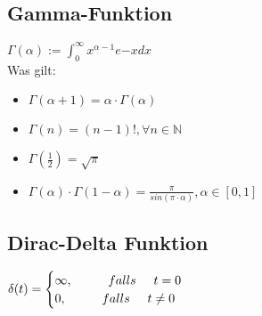 \begin{minipage}[t]{0.48\linewidth}
	
\subsection{Gamma-Funktion}
$\Gamma (\alpha):= \int_{0}^{\infty} x^{\alpha - 1} e{-x} dx$ \\

Was gilt:
\begin{itemize}
\item $\Gamma (\alpha + 1) = \alpha \cdot \Gamma (\alpha)$
\item $\Gamma (n) = (n-1)!, \forall n \in \mathbb{N}$
\item $\Gamma (\frac{1}{2}) = \sqrt{\pi} $
\item $\Gamma (\alpha) \cdot \Gamma (1-\alpha) = \frac{\pi}{sin(\pi \cdot \alpha)}, \alpha \in [0,1]$
\end{itemize}
\end{minipage}
\hfill
\begin{minipage}[t]{0.45\linewidth}
\subsection{Dirac-Delta Funktion}

$\delta(t) = \begin{cases}
\infty,  \hspace{1cm} falls \hspace{0.5cm}t = 0\\
0,  \hspace{1cm} falls \hspace{0.5cm} t \neq 0
\end{cases}$

\end{minipage}